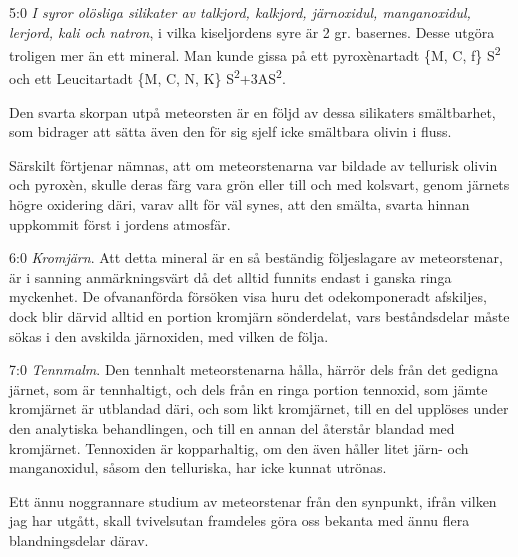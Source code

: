 \documentclass[a4paper, 12pt, oneside, swedish]{article}
\begin{document}
5:0 \emph{I syror olösliga silikater av talkjord, kalkjord, järnoxidul, manganoxidul, lerjord, kali och natron}, i vilka kiseljordens syre är 2 gr. basernes. Desse utgöra troligen mer än ett mineral. Man kunde gissa på ett pyroxènartadt \{M, C, ƒ\} S\textsuperscript{2} och ett Leucitartadt \{M, C, N, K\} S\textsuperscript{2}+3AS\textsuperscript{2}.

Den svarta skorpan utpå meteorsten är en följd av dessa silikaters smältbarhet, som bidrager att sätta även den för sig sjelf icke smältbara olivin i fluss.

Särskilt förtjenar nämnas, att om meteorstenarna var bildade av tellurisk olivin och pyroxèn, skulle deras färg vara grön eller till och med kolsvart, genom järnets högre oxidering däri, varav allt för väl synes, att den smälta, svarta hinnan uppkommit först i jordens atmosfär.

6:0 \emph{Kromjärn}. Att detta mineral är en så beständig följeslagare av meteorstenar, är i sanning anmärkningsvärt då det alltid funnits endast i ganska ringa myckenhet. De ofvananförda försöken visa huru det odekomponeradt afskiljes, dock blir därvid alltid en portion kromjärn sönderdelat, vars beståndsdelar måste sökas i den avskilda järnoxiden, med vilken de följa.

7:0 \emph{Tennmalm}. Den tennhalt meteorstenarna hålla, härrör dels från det gedigna järnet, som är tennhaltigt, och dels från en ringa portion tennoxid, som jämte kromjärnet är utblandad däri, och som likt kromjärnet, till en del upplöses under den analytiska behandlingen, och till en annan del återstår blandad med kromjärnet. Tennoxiden är kopparhaltig, om den även håller litet järn- och manganoxidul, såsom den telluriska, har icke kunnat utrönas.

Ett ännu noggrannare studium av meteorstenar från den synpunkt, ifrån vilken jag har utgått, skall tvivelsutan framdeles göra oss bekanta med ännu flera blandningsdelar därav.
\end{document}
